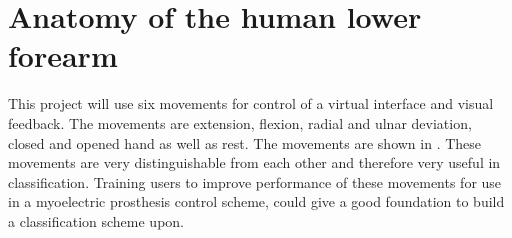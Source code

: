 \section{Anatomy of the human lower forearm} \label{sec:BG:anatomy}


This project will use six movements for control of a virtual interface and visual feedback. The movements are extension, flexion, radial and ulnar deviation, closed and opened hand as well as rest. The movements are shown in . %
These movements are very distinguishable from each other and therefore very useful in classification. %
Training users to improve performance of these movements for use in a myoelectric prosthesis control scheme, could give a good foundation to build a classification scheme upon. %



